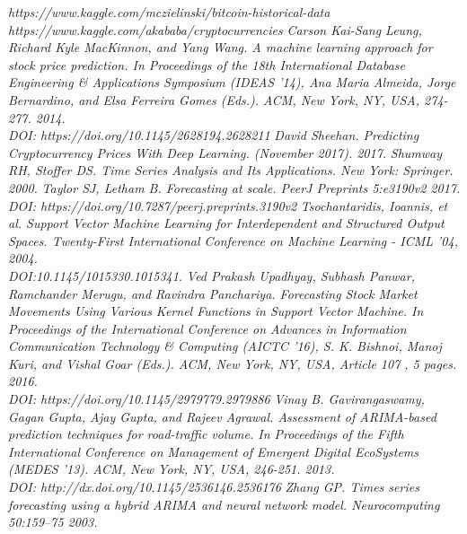 \documentclass[11pt,a4paper]{article}
\begin{document}
\clearpage


\begin{thebibliography}{10}

        \textit{https://www.kaggle.com/mczielinski/bitcoin-historical-data}
        \textit{https://www.kaggle.com/akababa/cryptocurrencies}
        \textit{Carson Kai-Sang Leung, Richard Kyle MacKinnon, and Yang Wang.
                A machine learning approach for stock price prediction. In
                Proceedings of the 18th International Database Engineering \&
                Applications Symposium (IDEAS '14), Ana Maria Almeida, Jorge
                Bernardino, and Elsa Ferreira Gomes (Eds.).
                ACM, New York, NY, USA, 274-277. 2014.\\
                DOI: https://doi.org/10.1145/2628194.2628211}
        \textit{David Sheehan. Predicting Cryptocurrency Prices With
                Deep Learning. (November 2017). 2017.}
         \textit{Shumway RH, Stoffer DS. Time Series Analysis and Its Applications. New York: Springer. 2000.}
        \textit{Taylor SJ, Letham B. Forecasting at scale. PeerJ
                Preprints 5:e3190v2 2017.\\ DOI: https://doi.org/10.7287/peerj.preprints.3190v2}
        \textit{Tsochantaridis, Ioannis, et al. Support Vector Machine
                Learning for Interdependent and Structured Output Spaces.
                Twenty-First International Conference on Machine Learning -
                ICML '04, 2004.\\
                DOI:10.1145/1015330.1015341.}
        \textit{Ved Prakash Upadhyay, Subhash Panwar, Ramchander Merugu, and
                Ravindra Panchariya. Forecasting Stock Market Movements Using Various
                Kernel Functions in Support Vector Machine. In Proceedings of the
                International Conference on Advances in Information Communication
                Technology \& Computing (AICTC '16), S. K. Bishnoi, Manoj Kuri, and
                Vishal Goar (Eds.). ACM, New York, NY, USA, Article 107 , 5 pages. 2016.\\
                DOI: https://doi.org/10.1145/2979779.2979886}
         \textit{Vinay B. Gavirangaswamy, Gagan Gupta, Ajay Gupta, and Rajeev
                Agrawal. Assessment of ARIMA-based prediction techniques for
                road-traffic volume. In Proceedings of the Fifth International
                Conference on Management of Emergent Digital EcoSystems (MEDES '13).
                ACM, New York, NY, USA, 246-251. 2013.\\
                DOI: http://dx.doi.org/10.1145/2536146.2536176}
        \textit{Zhang GP. Times series forecasting using a hybrid ARIMA and
                neural network model. Neurocomputing 50:159–75 2003.}

    \end{thebibliography}
\end{document}
